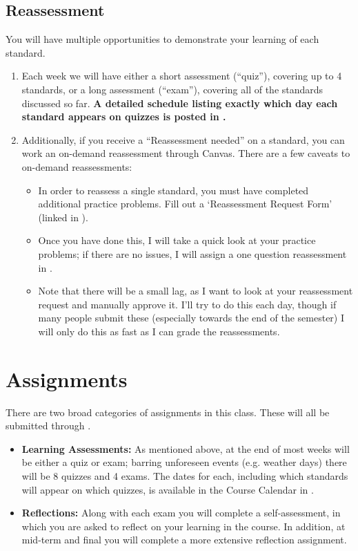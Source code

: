 \documentclass{article}
\begin{document}
    \subsection*{\fontsize{10}{12}\selectfont Reassessment}
    You will have multiple opportunities to demonstrate your learning of each standard.  
    \begin{enumerate}[1)]
    \item Each week we will have either a short assessment (``quiz''), covering  up to 4 standards, or a long assessment (``exam''), covering all of the standards discussed so far.  {\bf A detailed schedule listing exactly which day each standard appears on quizzes is posted in \LMS.}
    \item Additionally, if you receive a ``Reassessment needed'' on a standard, you can work an on-demand reassessment through Canvas.  There are a few caveats to on-demand reassessments:
    \begin{itemize}
    \item In order to reassess a single standard, you must have completed additional practice problems. Fill out a `Reassessment Request Form' (linked in \LMS).
    \item Once you have done this, I will take a quick look at your practice problems; if there are no issues, I will assign a one question reassessment in \LMS.
    \item Note that there will be a small lag, as I want to look at your reassessment request and manually approve it. I'll try to do this each day, though if many people submit these (especially towards the end of the semester) I will only do this as fast as I can grade the reassessments.
\end{itemize}
    \end{enumerate}



\section*{\fontsize{12}{15}\selectfont Assignments}
There are two broad categories of assignments in this class. These will all be submitted through \LMS.
\begin{itemize}
\item \textbf{Learning Assessments: } As mentioned above, at the end of most weeks will be either a quiz or exam; barring unforeseen events (e.g. weather days) there will be 8 quizzes and 4 exams.   The dates for each, including which standards will appear on which quizzes, is available in the Course Calendar in \LMS. 
\item \textbf{Reflections: } Along with each exam you will complete a self-assessment, in which you are asked to reflect on your learning in the course. In addition, at mid-term and final you will complete a more extensive reflection assignment.
\end{itemize}
\end{document}
